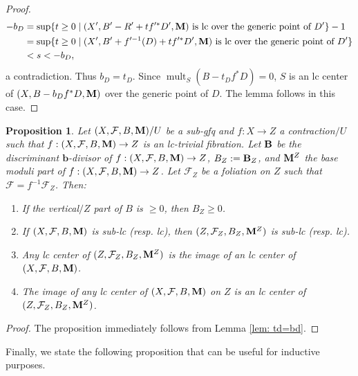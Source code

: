 \documentclass[11pt]{amsart}
\numberwithin{equation}{section}
\newcommand{\bb}{\bm{b}}
\newcommand{\Mm}{{\bf{M}}}
\newcommand{\mult}{\operatorname{mult}}
\newcommand{\Bb}{{\bf{B}}}
\newcommand{\Ff}{\mathcal{F}}
\newtheorem{prop}[thm]{Proposition}
\theoremstyle{definition}
\theoremstyle{definition}
\theoremstyle{definition}
\begin{document}
\begin{proof}
\begin{align*}
   -b_D&=\sup\{t\geq 0\mid (X',B'-R'+tf'^*D',\Mm)\text{ is lc over the generic point of } D'\}-1\\
   &=\sup\{t\geq 0\mid (X',B'+f'^{-1}(D)+tf'^*D',\Mm)\text{ is lc over the generic point of } D'\}\\
   &<s<-b_D,
\end{align*}
a contradiction. Thus $b_D=t_D$. Since $\mult_S(B-t_Df^*D)=0$, $S$ is an lc center of $(X,B-b_Df^*D,\Mm)$ over the generic point of $D$. The lemma follows in this case.
\end{proof}


\begin{prop}\label{prop: gfq cbf preserve sing}
Let $(X,\Ff,B,\Mm)/U$ be a sub-gfq and $f: X\rightarrow Z$ a contraction$/U$ such that $f: (X,\Ff,B,\Mm)\rightarrow Z$ is an lc-trivial fibration. Let $\Bb$ be the discriminant $\bb$-divisor of $f: (X,\Ff,B,\Mm)\rightarrow Z$, $B_Z:=\Bb_Z$, and $\Mm^Z$ the base moduli part of  $f: (X,\Ff,B,\Mm)\rightarrow Z$. Let $\Ff_Z$ be a foliation on $Z$ such that $\Ff=f^{-1}\Ff_Z$. Then:
\begin{enumerate}
    \item If the vertical$/Z$ part of $B$ is $\geq 0$, then $B_Z\geq 0$.
    \item If $(X,\Ff,B,\Mm)$ is sub-lc (resp. lc), then $(Z,\Ff_Z,B_Z,\Mm^Z)$ is sub-lc (resp. lc).
    \item Any lc center of $(Z,\Ff_Z,B_Z,\Mm^Z)$ is the image of an lc center of $(X,\Ff,B,\Mm)$.
    \item The image of any lc center of $(X,\Ff,B,\Mm)$ on $Z$ is an lc center of $(Z,\Ff_Z,B_Z,\Mm^Z)$.
\end{enumerate}
\end{prop}
\begin{proof}
The proposition immediately follows from Lemma \ref{lem: td=bd}.
\end{proof}

Finally, we state the following proposition that can be useful for inductive purposes.
\end{document}
